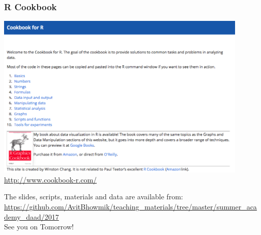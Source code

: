 \documentclass{beamer}
\begin{document}

\begin{frame}
\frametitle{R Cookbook}
\centering
\includegraphics[width=0.9\textwidth]{Figures/cookbook.png}\\
\href{http://www.cookbook-r.com/}{http://www.cookbook-r.com/}
\end{frame}


\begin{frame*}
\centering
The slides, scripts, materials and data are available from:\\
\href{https://github.com/AvitBhowmik/teaching_materials/tree/master/summer_academy_daad/2017}{\small{\alert{https://github.com/AvitBhowmik/teaching_materials/tree/master/summer_academy_daad/2017}}}\\
\vspace{1cm}
\Huge See you on Tomorrow!
\end{frame*}

\end{document}
